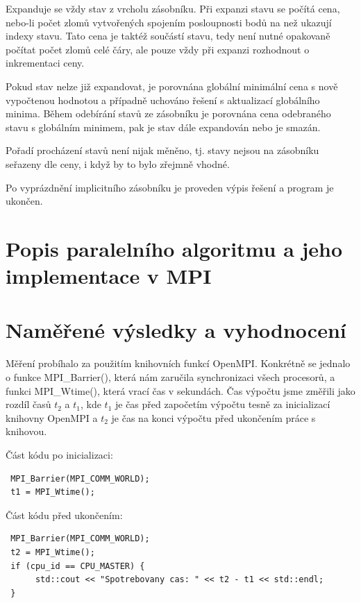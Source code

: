 \documentclass[12pt]{article}
\begin{document}
Expanduje se vždy stav z vrcholu zásobníku. Při expanzi stavu se počítá cena, nebo-li počet zlomů vytvořených spojením posloupnosti bodů na než ukazují indexy stavu. Tato cena je taktéž součástí stavu, tedy není nutné opakovaně počítat počet zlomů celé čáry, ale pouze vždy při expanzi rozhodnout o inkrementaci ceny.

Pokud stav nelze již expandovat, je porovnána globální minimální cena s nově vypočtenou hodnotou a případně uchováno řešení s aktualizací globálního minima. Během odebírání stavů ze zásobníku je porovnána cena odebraného stavu s globálním minimem, pak je stav dále expandován nebo je smazán.

Pořadí procházení stavů není nijak měněno, tj. stavy nejsou na zásobníku seřazeny dle ceny, i když by to bylo zřejmně vhodné.

Po vyprázdnění implicitního zásobníku je proveden výpis řešení a program je ukončen.


\section{Popis paralelního algoritmu a jeho implementace v MPI}

\section{Naměřené výsledky a vyhodnocení}
Měření probíhalo za použitím knihovních funkcí OpenMPI. Konkrétně se jednalo o funkce MPI\_Barrier(), 
která nám zaručila synchronizaci všech procesorů, a funkci MPI\_Wtime(), která vrací čas v sekundách.
Čas výpočtu jsme změřili jako rozdíl časů \(t_2\) a \(t_1\), kde \(t_1\) je čas před započetím výpočtu
tesně za inicializací knihovny OpenMPI a \(t_2\) je čas na konci výpočtu před ukončením práce s knihovou.

Část kódu po inicializaci:
\begin{verbatim}
 MPI_Barrier(MPI_COMM_WORLD);
 t1 = MPI_Wtime();
\end{verbatim}
Část kódu před ukončením:
\begin{verbatim}
 MPI_Barrier(MPI_COMM_WORLD);
 t2 = MPI_Wtime();
 if (cpu_id == CPU_MASTER) {
      std::cout << "Spotrebovany cas: " << t2 - t1 << std::endl;
 }
\end{verbatim}
\end{document}
